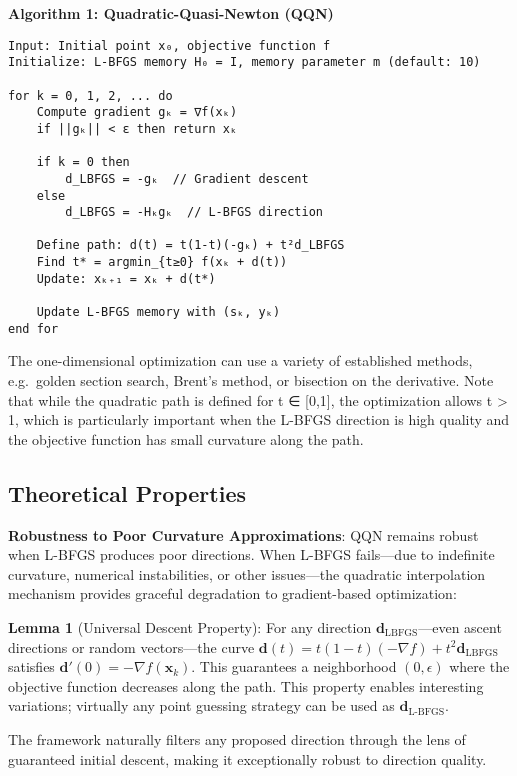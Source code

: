 \textbf{Algorithm 1: Quadratic-Quasi-Newton (QQN)}

\begin{verbatim}
Input: Initial point x₀, objective function f
Initialize: L-BFGS memory H₀ = I, memory parameter m (default: 10)

for k = 0, 1, 2, ... do
    Compute gradient gₖ = ∇f(xₖ)
    if ||gₖ|| < ε then return xₖ

    if k = 0 then
        d_LBFGS = -gₖ  // Gradient descent
    else
        d_LBFGS = -Hₖgₖ  // L-BFGS direction

    Define path: d(t) = t(1-t)(-gₖ) + t²d_LBFGS
    Find t* = argmin_{t≥0} f(xₖ + d(t))
    Update: xₖ₊₁ = xₖ + d(t*)

    Update L-BFGS memory with (sₖ, yₖ)
end for
\end{verbatim}

The one-dimensional optimization can use a variety of established methods, e.g.~golden section search, Brent's method, or bisection on the derivative.
Note that while the quadratic path is defined for t ∈ {[}0,1{]}, the optimization allows t \textgreater{} 1, which is particularly important when the L-BFGS direction is high quality and the objective function has small curvature along the path.

\hypertarget{theoretical-properties}{%
\subsection{Theoretical Properties}\label{theoretical-properties}}

\textbf{Robustness to Poor Curvature Approximations}: QQN remains robust when L-BFGS produces poor directions.
When L-BFGS fails---due to indefinite curvature, numerical instabilities, or other issues---the quadratic interpolation mechanism provides graceful degradation to gradient-based optimization:

\textbf{Lemma 1} (Universal Descent Property): For any direction \(\mathbf{d}_{\text{LBFGS}}\)---even ascent directions or random vectors---the curve \(\mathbf{d}(t) = t(1-t)(-\nabla f) + t^2 \mathbf{d}_{\text{LBFGS}}\) satisfies \(\mathbf{d}'(0) = -\nabla f(\mathbf{x}_k)\).
This guarantees a neighborhood \((0, \epsilon)\) where the objective function decreases along the path.
This property enables interesting variations; virtually any point guessing strategy can be used as \(\mathbf{d}_{\text{L-BFGS}}\).

The framework naturally filters any proposed direction through the lens of guaranteed initial descent, making it exceptionally robust to direction quality.

